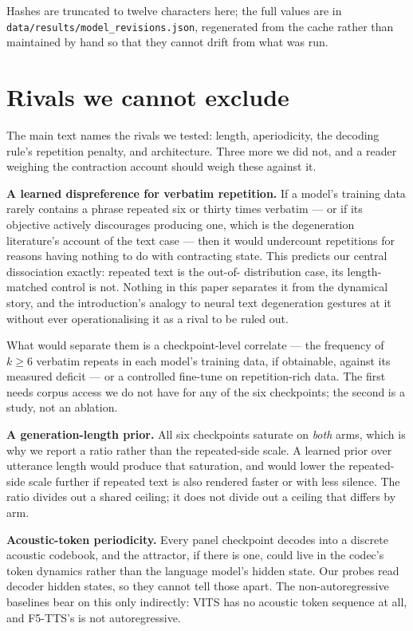 \documentclass[11pt]{article}
\begin{document}
\noindent Hashes are truncated to twelve characters here; the full values are in
\texttt{data/results/model\_revisions.json}, regenerated from the cache rather
than maintained by hand so that they cannot drift from what was run.


\section{Rivals we cannot exclude}

The main text names the rivals we tested: length, aperiodicity, the decoding
rule's repetition penalty, and architecture. Three more we did not, and a reader
weighing the contraction account should weigh these against it.

\noindent\textbf{A learned dispreference for verbatim repetition.} If a model's
training data rarely contains a phrase repeated six or thirty times verbatim ---
or if its objective actively discourages producing one, which is the
degeneration literature's account of the text case --- then it would undercount
repetitions for reasons having nothing to do with contracting state. This
predicts our central dissociation exactly: repeated text is the out-of-
distribution case, its length-matched control is not. Nothing in this paper
separates it from the dynamical story, and the introduction's analogy to neural
text degeneration gestures at it without ever operationalising it as a rival to
be ruled out.

What would separate them is a checkpoint-level correlate --- the frequency of
$k\ge6$ verbatim repeats in each model's training data, if obtainable, against
its measured deficit --- or a controlled fine-tune on repetition-rich data. The
first needs corpus access we do not have for any of the six checkpoints; the
second is a study, not an ablation.

\noindent\textbf{A generation-length prior.} All six checkpoints saturate on
\emph{both} arms, which is why we report a ratio rather than the repeated-side
scale. A learned prior over utterance length would produce that saturation, and
would lower the repeated-side scale further if repeated text is also rendered
faster or with less silence. The ratio divides out a shared ceiling; it does not
divide out a ceiling that differs by arm.

\noindent\textbf{Acoustic-token periodicity.} Every panel checkpoint decodes into
a discrete acoustic codebook, and the attractor, if there is one, could live in
the codec's token dynamics rather than the language model's hidden state. Our
probes read decoder hidden states, so they cannot tell those apart. The
non-autoregressive baselines bear on this only indirectly: VITS has no acoustic
token sequence at all, and F5-TTS's is not autoregressive.
\end{document}
